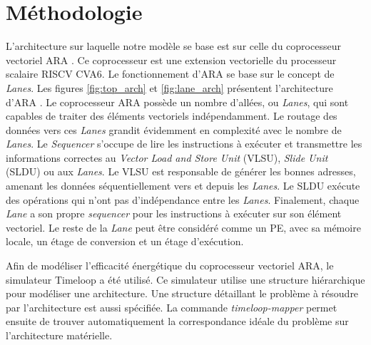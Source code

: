 \documentclass[10pt,letterpaper]{article}
\begin{document}
\section{Méthodologie}
    \begin{multicols}{2}

    L'architecture sur laquelle notre modèle se base est sur celle du coprocesseur 
    vectoriel ARA \cite{ara_paper}. Ce coprocesseur est une extension vectorielle du processeur scalaire
    RISCV CVA6. Le fonctionnement d’ARA se base sur le concept de \textit{Lanes}. 
    Les figures \ref{fig:top_arch} et \ref{fig:lane_arch} présentent l'architecture d’ARA \cite{bougenot_2020}.
    Le coprocesseur ARA possède un nombre d'allées, ou \textit{Lanes}, qui sont capables de traiter des
    éléments vectoriels indépendamment. Le routage des données vers ces \textit{Lanes} grandit évidemment en complexité
    avec le nombre de \textit{Lanes}. Le \textit{Sequencer} s'occupe de lire les instructions à exécuter 
    et transmettre les informations correctes au \textit{Vector Load and Store Unit} (VLSU), 
    \textit{Slide Unit} (SLDU) ou aux \textit{Lanes}. Le VLSU est responsable de générer les bonnes
    adresses, amenant les données séquentiellement vers et depuis les \textit{Lanes}. 
    Le SLDU exécute des opérations qui n'ont pas d'indépendance entre les \textit{Lanes}.
    Finalement, chaque \textit{Lane} a son propre \textit{sequencer} pour les instructions à exécuter
    sur son élément vectoriel. Le reste de la \textit{Lane} peut être considéré comme un PE, avec sa mémoire locale,
    un étage de conversion et un étage d'exécution.

    Afin de modéliser l'efficacité énergétique du coprocesseur vectoriel ARA, le simulateur Timeloop a été 
    utilisé. Ce simulateur utilise une structure hiérarchique pour modéliser une architecture. Une structure
    détaillant le problème à résoudre par l'architecture est aussi spécifiée. La commande \textit{timeloop-mapper}
    permet ensuite de trouver automatiquement la correspondance idéale du problème sur l'architecture matérielle.


\end{multicols}
\end{document}
